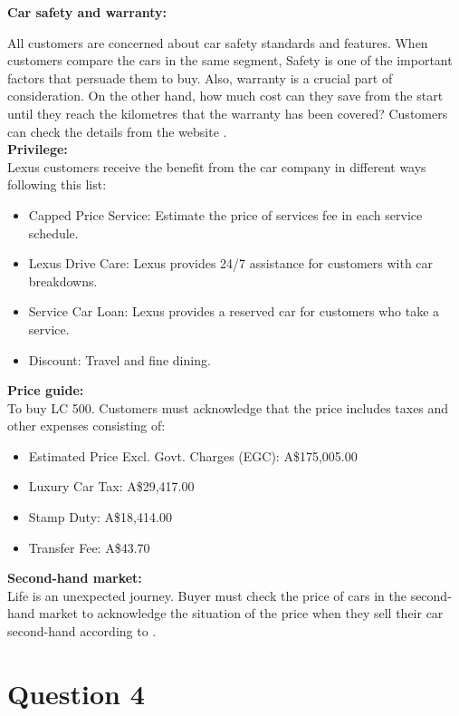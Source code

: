 \documentclass[12pt,a4paper]{article}
\begin{document}
\noindent\textbf{Car safety and warranty:}  

\noindent All customers are concerned about car safety standards and features. When customers compare the cars in the same segment, Safety is one of the important factors that persuade them to buy. Also, warranty is a crucial part of consideration. On the other hand, how much cost can they save from the start until they reach the kilometres that the warranty has been covered? Customers can check the details from the website \cite{Ref3.2}.\\

\noindent\textbf{Privilege: }\\
\noindent Lexus customers receive the benefit from the car company in different ways following this list:
\begin{itemize}
    \item Capped Price Service: Estimate the price of services fee in each service schedule.
    \item Lexus Drive Care: Lexus provides 24/7 assistance for customers with car breakdowns.
    \item Service Car Loan: Lexus provides a reserved car for customers who take a service.
    \item Discount: Travel and fine dining. 
\end{itemize}

\noindent\textbf{Price guide: }\\
\noindent To buy LC 500. Customers must acknowledge that the price includes taxes and other expenses consisting of:

\begin{itemize}
    \item Estimated Price Excl. Govt. Charges (EGC): A\$175,005.00
    \item Luxury Car Tax: A\$29,417.00
    \item Stamp Duty: A\$18,414.00
    \item Transfer Fee: A\$43.70 
\end{itemize}

\noindent\textbf{Second-hand market: }\\
\noindent Life is an unexpected journey. Buyer must check the price of cars in the second-hand market to acknowledge the situation of the price when they sell their car second-hand according to \cite{Ref3.3}.  
\pagebreak

\setcounter{page}{5}
\section{Question 4}
\end{document}
